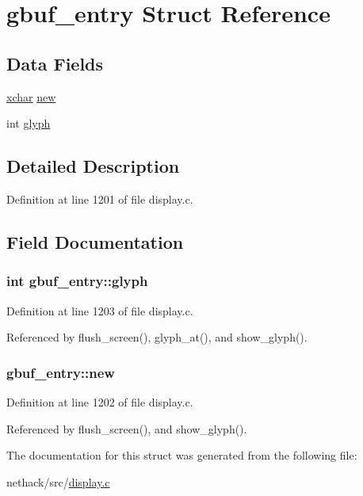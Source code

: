 \hypertarget{structgbuf__entry}{\section{gbuf\+\_\+entry Struct Reference}
\label{structgbuf__entry}
}
\subsection*{Data Fields}
\begin{DoxyCompactItemize}
\item 
\hyperlink{global_8h_a2043b7d01ce89f4ee2fa6c345a752d32}{xchar} \hyperlink{structgbuf__entry_a50390314322d581c9b80535ecca7d5c1}{new}
\item 
int \hyperlink{structgbuf__entry_a7fdd281e49e8feac519137fb4eb2be05}{glyph}
\end{DoxyCompactItemize}


\subsection{Detailed Description}


Definition at line 1201 of file display.\+c.



\subsection{Field Documentation}
\hypertarget{structgbuf__entry_a7fdd281e49e8feac519137fb4eb2be05}{
\subsubsection[{glyph}]{\setlength{\rightskip}{0pt plus 5cm}int gbuf\+\_\+entry\+::glyph}}\label{structgbuf__entry_a7fdd281e49e8feac519137fb4eb2be05}


Definition at line 1203 of file display.\+c.



Referenced by flush\+\_\+screen(), glyph\+\_\+at(), and show\+\_\+glyph().

\hypertarget{structgbuf__entry_a50390314322d581c9b80535ecca7d5c1}{
\subsubsection[{new}]{ gbuf\+\_\+entry\+::new}}\label{structgbuf__entry_a50390314322d581c9b80535ecca7d5c1}


Definition at line 1202 of file display.\+c.



Referenced by flush\+\_\+screen(), and show\+\_\+glyph().



The documentation for this struct was generated from the following file\+:\begin{DoxyCompactItemize}
\item 
nethack/src/\hyperlink{display_8c}{display.\+c}\end{DoxyCompactItemize}
